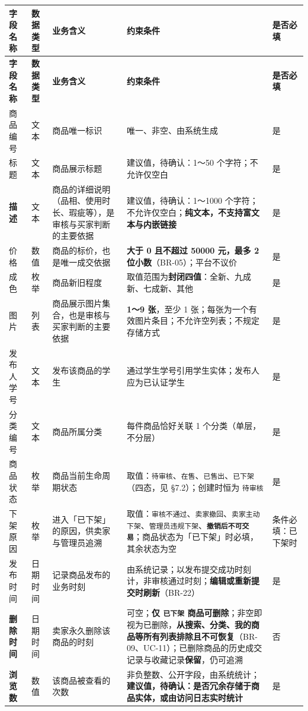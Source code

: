 \documentclass[12pt,a4paper]{ctexart}
\begin{document}
{\scriptsize
\begin{longtable}{|p{1.45cm}|p{1.45cm}|p{4.07cm}|p{7.47cm}|p{1.56cm}|}
\hline
\textbf{字段名称} & \textbf{数据类型} & \textbf{业务含义} & \textbf{约束条件} & \textbf{是否必填} \\
\hline
\endfirsthead
\hline
\textbf{字段名称} & \textbf{数据类型} & \textbf{业务含义} & \textbf{约束条件} & \textbf{是否必填} \\
\hline
\endhead
\hline
\endfoot
商品编号 & 文本 & 商品唯一标识 & 唯一、非空、由系统生成 & 是 \\
\hline
标题 & 文本 & 商品展示标题 & 建议值，待确认：1～50 个字符；不允许仅空白 & 是 \\
\hline
\textbf{描述} & 文本 & 商品的详细说明（品相、使用时长、瑕疵等），是审核与买家判断的主要依据 & 建议值，待确认：1～1000 个字符；不允许仅空白；\textbf{纯文本，不支持富文本与内嵌链接} & 是 \\
\hline
价格 & 数值 & 商品的标价，也是唯一成交依据 & \textbf{大于 0 且不超过 50000 元，最多 2 位小数}（BR-05）；平台不议价 & 是 \\
\hline
成色 & 枚举 & 商品新旧程度 & 取值范围为\textbf{封闭四值}：全新、九成新、七成新、其他 & 是 \\
\hline
图片 & 列表 & 商品展示图片集合，也是审核与买家判断的主要依据 & \textbf{1～9 张}，至少 1 张；每张为一个有效图片条目；不允许空列表；不规定存储方式 & 是 \\
\hline
发布人学号 & 文本 & 发布该商品的学生 & 通过学生学号引用学生实体；发布人应为已认证学生 & 是 \\
\hline
分类编号 & 文本 & 商品所属分类 & 每件商品恰好关联 1 个分类（单层，不分层） & 是 \\
\hline
商品状态 & 枚举 & 商品当前生命周期状态 & 取值：\texttt{待审核}、\texttt{在售}、\texttt{已售出}、\texttt{已下架}（四态，见 §7.2）；创建时恒为 \texttt{待审核} & 是 \\
\hline
下架原因 & 枚举 & 进入「已下架」的原因，供卖家与管理员追溯 & 取值：\texttt{审核不通过}、\texttt{卖家撤回}、\texttt{卖家主动下架}、\texttt{管理员违规下架}、\textbf{\texttt{撤销后不可交易}}；商品状态为「已下架」时必填，其余状态为空 & 条件必填：已下架时 \\
\hline
发布时间 & 日期时间 & 记录商品发布的业务时刻 & 由系统记录；以发布提交成功时刻计，非审核通过时刻；\textbf{编辑或重新提交时刷新}（BR-22） & 是 \\
\hline
\textbf{删除时间} & 日期时间 & 卖家永久删除该商品的时刻 & 可空；\textbf{仅 \texttt{已下架} 商品可删除}；非空即视为已删除，\textbf{从搜索、分类、我的商品等所有列表排除且不可恢复}（BR-09、UC-11）；已删除商品的历史成交记录与收藏记录\textbf{保留}，仍可追溯 & 否 \\
\hline
\textbf{浏览数} & 数值 & 该商品被查看的次数 & 非负整数、公开字段，由系统统计；\textbf{建议值，待确认：是否冗余存储于商品实体，或由访问日志实时统计} & 是 \\
\hline
\end{longtable}
}
\end{document}
